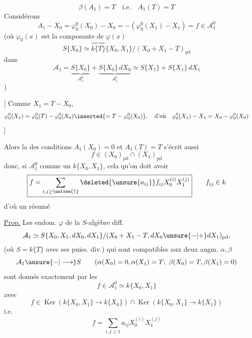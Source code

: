 \[
\boxed{\boxed{\beta(A_1)=T}}\quad\text{i.e.}\quad A_1(T)=T
\]
 Considérons
\[
A_1-X_0=\varphi_0^0(X_0)-X_0=-(\varphi_0^0(X_1)-X_1)=f\in\mathcal A_1^0
\]
(où $\varphi_0(x)$ est la composante de $\varphi(x)$ 
\[
S\{X_0\}\simeq\overbrace{k\{T\}}\{X_0,X_1\}/(X_0+X_1-T)_{\mathrm{pd}}
\]
dans
\[
\mathcal A_1=\underbrace{S\{X_0\}}_{\mathcal A_1^0}+\underbrace{S\{X_0\}\,dX_0}_{\mathcal A_1^1}\simeq S\{X_1\}+S\{X_1\}\,dX_1
\]
)

[ Comme $X_1=T-X_0$, 
\[
\varphi_0^0(X_1)=\varphi_0^0(T)-\varphi_0^0(X_0)\inserted{=T-\varphi_0^0(X_0)},\quad\text{d'où}\quad\varphi_0^0(X_1)-X_1=X_0-\varphi_0^0(X_0)
\]
]

Alors la  des conditions $A_1(X_0)=0$ et $A_1(T)=T$ s'écrit aussi
\[
f\in(X_0)_{\mathrm{pd}}\cap(X_1)_{\mathrm{pd}}
\]
donc, si  $\mathcal A_1^0$ comme un  $k\{X_0,X_1\}$, cela  qu'on doit avoir
\[
\boxed{f=\sum_{i,j\ge\text{\uuline{1}}}\deleted{\unsure{a_{ij}}}f_{ij}X_0^{(i)}X_1^{(j)}}\qquad f_{ij}\in k
\]
d'où un résumé

\uline{Prop.} Les endom. $\varphi$ de la $S$-algèbre diff.
\[
\mathcal A_1\simeq S\{X_0,X_1,dX_0,dX_1\}/(X_0+X_1-T,dX_0\unsure{-|+}dX_1)_{\mathrm{pd}},
\]
(où $S=k\{T\}$ avec ses puiss. div.) qui sont compatibles aux deux augm. $\alpha,\beta$
\[
\mathcal A_1\unsure{-|\longrightarrow}S\qquad(\alpha(X_0)=0,\alpha(X_1)=T;\ \beta(X_0)=T,\beta(X_1)=0)
\]
sont donnés exactement par les 
\[
f\in\mathcal A_1^0\simeq k\{X_0,X_1\}
\]
avec
\[
f\in\operatorname{Ker}(k\{X_0,X_1\}\to k\{X_0\})\cap\operatorname{Ker}(k\{X_0,X_1\}\to k\{X_1\})
\]
i.e.
\[
\boxed{f=\sum_{i,j\ge1}a_{ij}X_0^{(i)}X_1^{(j)}}
\]
